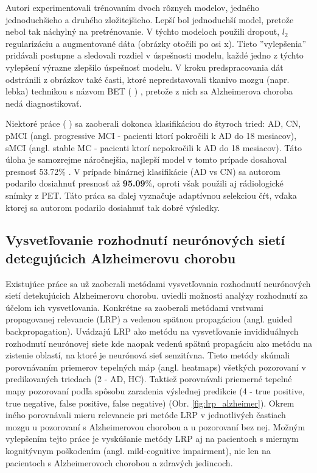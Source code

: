 Autori experimentovali trénovaním dvoch rôznych modelov, jedného jednoduchšieho a druhého zložitejšieho. Lepší bol jednoduchší model, pretože nebol tak náchylný na pretrénovanie. V týchto modeloch použili dropout, $l_2$ regularizáciu a augmentované dáta (obrázky otočili po osi x). Tieto ''vylepšenia'' pridávali postupne a sledovali rozdiel v úspešnosti modelu, každé jedno z týchto vylepšení výrazne zlepšilo úspešnosť modelu. V kroku predspracovania dát odstránili z obrázkov také časti, ktoré nepredstavovali tkanivo mozgu (napr. lebka) technikou s názvom BET (\citeauthor*{smith2002fast} \citeyear{smith2002fast}) \cite{smith2002fast}, pretože z nich sa Alzheimerova choroba nedá diagnostikovať.

Niektoré práce (\citeauthor*{suk2016deep} \citeyear{suk2016deep}) sa zaoberali dokonca klasifikáciou do štyroch tried: AD, CN, pMCI (angl. progressive MCI - pacienti ktorí pokročili k AD do 18 mesiacov), sMCI (angl. stable MC - pacienti ktorí nepokročili k AD do 18 mesiacov). Táto úloha je samozrejme náročnejšia, najlepší model v tomto prípade dosahoval presnosť 53.72\% \cite{suk2016deep}. V prípade binárnej klasifikácie (AD vs CN) sa autorom podarilo dosiahnuť presnosť až \textbf{95.09}\%, oproti \citeauthor*{esmaeilzadeh2018end} však použili aj rádiologické snímky z PET. Táto práca sa ďalej vyznačuje adaptívnou selekciou čŕt, vďaka ktorej sa autorom podarilo dosiahnuť tak dobré výsledky.



\subsection{Vysvetľovanie rozhodnutí neurónových sietí detegujúcich Alzheimerovu chorobu \label{sec:ad_nn_explanation}}

Existujúce práce sa už zaoberali metódami vysvetľovania rozhodnutí neurónových sietí detekujúcich Alzheimerovu chorobu. \citeauthor{bohle2019layer} \citeyear{bohle2019layer} uviedli možnosti analýzy rozhodnutí za účelom ich vysvetľovania. Konkrétne sa zaoberali metódami vrstvami propagovanej relevancie (LRP) a vedenou spätnou propagáciou (angl. guided backpropagation). Uvádzajú LRP ako metódu na vysvetľovanie invididuálnych rozhodnutí neurónovej siete kde naopak vedenú spätnú propagáciu ako metódu na zistenie oblastí, na ktoré je neurónová sieť senzitívna. Tieto metódy skúmali porovnávaním priemerov tepelných máp (angl. heatmaps) všetkých pozorovaní v predikovaných triedach (2 - AD, HC). Taktiež porovnávali priemerné tepelné mapy pozorovaní podľa spôsobu zaradenia výslednej predikcie (4 - true positive, true negative, false positive, false negative) (Obr. \ref{fig:lrp_alzheimer}). Okrem iného porovnávali mieru relevancie pri metóde LRP v jednotlivých častiach mozgu u pozorovaní s Alzheimerovou chorobou a u pozorovaní bez nej. Možným vylepšením tejto práce je vyskúšanie metódy LRP aj na pacientoch s miernym kognitývnym poškodením (angl. mild-cognitive impairment), nie len na pacientoch s Alzheimerovoch chorobou a zdravých jedincoch.


